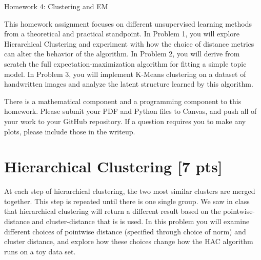 \documentclass[submit]{harvardml}
\begin{document}
	\begin{center}
		{\Large Homework 4: Clustering and EM}\\
	\end{center}
	
	
	This homework assignment focuses on different unsupervised learning
	methods from a theoretical and practical standpoint.  In Problem 1, you
	will explore Hierarchical Clustering and experiment with how the
	choice of distance metrics can alter the behavior of the algorithm. In
	Problem 2, you will derive from scratch the full
	expectation-maximization algorithm for fitting a simple topic
	model. In Problem 3, you will implement K-Means clustering on a
	dataset of handwritten images and analyze the latent structure learned by 
	this algorithm.
	
	
	
	There is a mathematical component and a programming component to this homework.
	Please submit your PDF and Python files to Canvas, and push all of your work to your GitHub
	repository. If a question requires you to make any plots, please
	include those in the writeup.
	
	
	
	\newpage
	\section*{Hierarchical Clustering [7 pts]}
	
	At each step of hierarchical clustering, the two most similar clusters
	are merged together. This step is repeated until there is one single
	group. We saw in class that hierarchical clustering will return a
	different result based on the pointwise-distance and cluster-distance
	that is is used. In this problem you will examine different choices of
	pointwise distance (specified through choice of norm) and cluster
	distance, and explore how these choices change how the HAC algorithm
	runs on a toy data set.
	
	
	\vspace{0.25cm}
	
\end{document}
